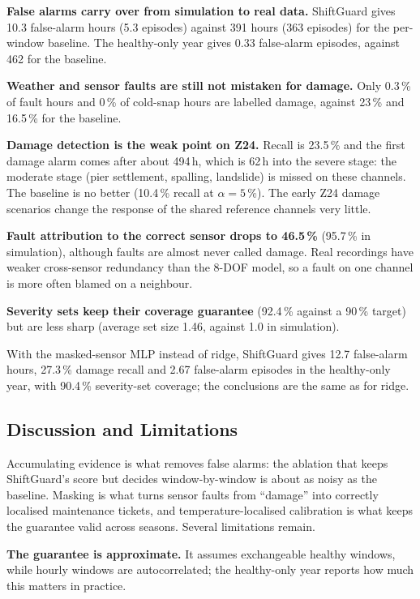 \documentclass[conference]{IEEEtran}
\begin{document}
\textbf{False alarms carry over from simulation to real data.} ShiftGuard gives 10.3 false-alarm hours (5.3 episodes) against 391 hours (363 episodes) for the per-window baseline. The healthy-only year gives 0.33 false-alarm episodes, against 462 for the baseline.

\textbf{Weather and sensor faults are still not mistaken for damage.} Only 0.3\,\% of fault hours and 0\,\% of cold-snap hours are labelled damage, against 23\,\% and 16.5\,\% for the baseline.

\textbf{Damage detection is the weak point on Z24.} Recall is 23.5\,\% and the first damage alarm comes after about 494\,h, which is 62\,h into the severe stage: the moderate stage (pier settlement, spalling, landslide) is missed on these channels. The baseline is no better (10.4\,\% recall at $\alpha=5\,\%$). The early Z24 damage scenarios change the response of the shared reference channels very little.

\textbf{Fault attribution to the correct sensor drops to 46.5\,\%} (95.7\,\% in simulation), although faults are almost never called damage. Real recordings have weaker cross-sensor redundancy than the 8-DOF model, so a fault on one channel is more often blamed on a neighbour.

\textbf{Severity sets keep their coverage guarantee} (92.4\,\% against a 90\,\% target) but are less sharp (average set size 1.46, against 1.0 in simulation).

With the masked-sensor MLP instead of ridge, ShiftGuard gives 12.7 false-alarm hours, 27.3\,\% damage recall and 2.67 false-alarm episodes in the healthy-only year, with 90.4\,\% severity-set coverage; the conclusions are the same as for ridge.

\subsection{Discussion and Limitations}
Accumulating evidence is what removes false alarms: the ablation that keeps ShiftGuard's score but decides window-by-window is about as noisy as the baseline. Masking is what turns sensor faults from ``damage'' into correctly localised maintenance tickets, and temperature-localised calibration is what keeps the guarantee valid across seasons. Several limitations remain.

\textbf{The guarantee is approximate.} It assumes exchangeable healthy windows, while hourly windows are autocorrelated; the healthy-only year reports how much this matters in practice.
\end{document}
